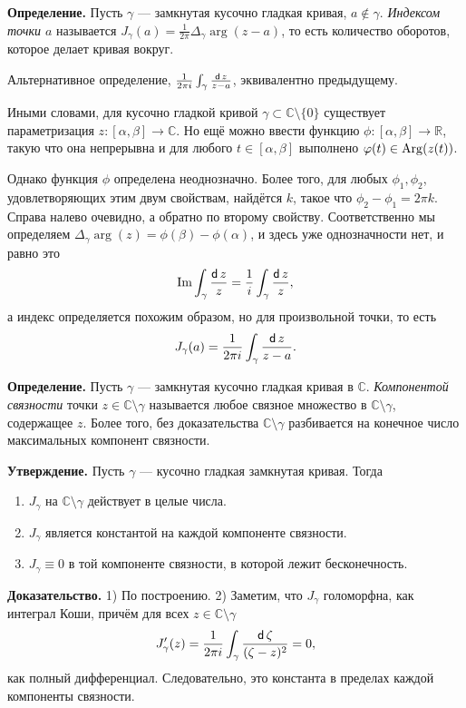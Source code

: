 \textbf{Определение.} Пусть $\gamma$ --- замкнутая кусочно гладкая кривая, $a \not\in \gamma$.
\textit{Индексом точки $a$} называется $J_\gamma(a) = \frac{1}{2\pi} \Delta_\gamma \arg(z - a)$, то есть количество оборотов, которое делает кривая вокруг.

Альтернативное определение, $\frac{1}{2\pi i} \int_\gamma \frac{\operatorname{\mathsf d} z}{z - a}$, эквивалентно предыдущему.

Иными словами, для кусочно гладкой кривой $\gamma \subset \mathbb C \setminus \{0\}$ существует параметризация $z: [\alpha, \beta] \to \mathbb C$.
Но ещё можно ввести функцию $\phi: [\alpha, \beta] \to \mathbb R$, такую что она непрерывна и для любого $t \in [\alpha, \beta]$ выполнено $\varphi(t) \in \operatorname{Arg}(z(t))$.

Однако функция $\phi$ определена неоднозначно.
Более того, для любых $\phi_1, \phi_2$, удовлетворяющих этим двум свойствам, найдётся $k$, такое что $\phi_2 - \phi_1 = 2\pi k$.
Справа налево очевидно, а обратно по второму свойству.
Соответственно мы определяем $\Delta_\gamma \arg(z) = \phi(\beta) - \phi(\alpha)$, и здесь уже однозначности нет, и равно это
\[
    \operatorname{Im} \int_\gamma \frac{\operatorname{\mathsf d} z}{z} = \frac{1}{i} \int_\gamma \frac{\operatorname{\mathsf d} z}{z},
\]
а индекс определяется похожим образом, но для произвольной точки, то есть
\[
    J_\gamma(a) = \frac{1}{2\pi i} \int_\gamma \frac{\operatorname{\mathsf d} z}{z - a}.
\]

\textbf{Определение.} Пусть $\gamma$ --- замкнутая кусочно гладкая кривая в $\mathbb C$.
\textit{Компонентой связности} точки $z \in \mathbb C \setminus \gamma$ называется любое связное множество в $\mathbb C \setminus \gamma$, содержащее $z$.
Более того, без доказательства $\mathbb C \setminus \gamma$ разбивается на конечное число максимальных компонент связности.

\textbf{Утверждение.} Пусть $\gamma$ --- кусочно гладкая замкнутая кривая.
Тогда
\begin{enumerate}
    \item $J_\gamma$ на $\mathbb C \setminus \gamma$ действует в целые числа.
    \item $J_\gamma$ является константой на каждой компоненте связности.
    \item $J_\gamma \equiv 0$ в той компоненте связности, в которой лежит бесконечность.
\end{enumerate}

\textbf{Доказательство.} 1) По построению.
2) Заметим, что $J_\gamma$ голоморфна, как интеграл Коши, причём для всех $z \in \mathbb C \setminus \gamma$
\[
    J'_\gamma(z) = \frac{1}{2\pi i} \int_\gamma \frac{\operatorname{\mathsf d} \zeta}{(\zeta - z)^2} = 0,
\]
как полный дифференциал.
Следовательно, это константа в пределах каждой компоненты связности.

